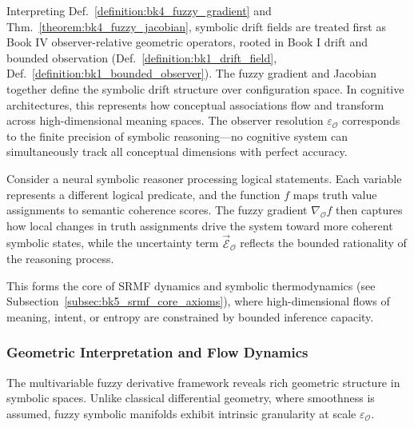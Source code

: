 
\begin{scholium}
\label{scholium:bk4_symbolic_drift_fields}
Interpreting Def.~\ref{definition:bk4_fuzzy_gradient} and Thm.~\ref{theorem:bk4_fuzzy_jacobian}, symbolic drift fields are treated first as Book IV observer-relative geometric operators, rooted in Book I drift and bounded observation (Def.~\ref{definition:bk1_drift_field}, Def.~\ref{definition:bk1_bounded_observer}).
The fuzzy gradient and Jacobian together define the symbolic drift structure over configuration space. In cognitive architectures, this represents how conceptual associations flow and transform across high-dimensional meaning spaces. The observer resolution $\varepsilon_{\mathcal{O}}$ corresponds to the finite precision of symbolic reasoning---no cognitive system can simultaneously track all conceptual dimensions with perfect accuracy.

Consider a neural symbolic reasoner processing logical statements. Each variable represents a different logical predicate, and the function $f$ maps truth value assignments to semantic coherence scores. The fuzzy gradient $\nabla_{\mathcal{O}} f$ then captures how local changes in truth assignments drive the system toward more coherent symbolic states, while the uncertainty term $\vec{\mathcal{E}}_{\mathcal{O}}$ reflects the bounded rationality of the reasoning process.

This forms the core of SRMF dynamics and symbolic thermodynamics (see Subsection~\ref{subsec:bk5_srmf_core_axioms}), where high-dimensional flows of meaning, intent, or entropy are constrained by bounded inference capacity.
\end{scholium}


\subsubsection{Geometric Interpretation and Flow Dynamics}
\label{subsubsec:bk4_geometric_interpretation_flow_dynamics}

The multivariable fuzzy derivative framework reveals rich geometric structure in symbolic spaces. Unlike classical differential geometry, where smoothness is assumed, fuzzy symbolic manifolds exhibit intrinsic granularity at scale $\varepsilon_{\mathcal{O}}$.

